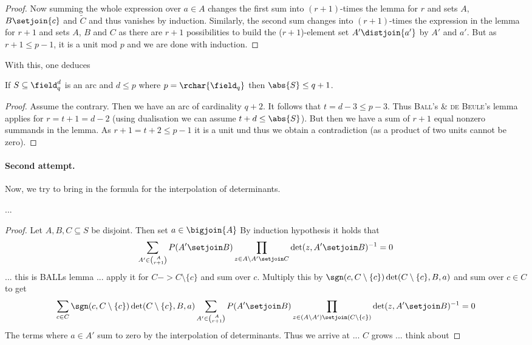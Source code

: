 \message{ !name(OnTheRAIDProblem.tex)}\documentclass[8pt,a4paper]{article}
\begin{document}
\begin{proof}
Now summing the whole expression over $a\in A$ changes the first sum into $(r+1)$-times the lemma for $r$ and sets $A$, $B\setjoin\{c\}$ and $\tilde{C}$ and thus vanishes by induction. Similarly, the second sum changes into $(r+1)$-times the expression in the lemma for $r+1$ and sets $A$, $B$ and $C$ as there are $r+1$ possibilities to build the ($r+1$)-element set $A'\distjoin\{a'\}$ by $A'$ and $a'$. But as $r+1\leq p-1$, it is a unit mod $p$ and we are done with induction.
\end{proof}

With this, one deduces

\begin{corollary}\label{cor:mdsconjpcase}
If $S\subseteq \field_q^d$ is an arc and $d\leq p$ where $p=\rchar{\field_q}$ then $\abs{S}\leq q+1$.
\end{corollary}

\begin{proof}
Assume the contrary. Then we have an arc of cardinality $q+2$. It follows that $t=d-3\leq p-3$. Thus \textsc{Ball}'s \& \textsc{de Beule}'s lemma applies for $r=t+1=d-2$ (using dualisation we can assume $t+d\leq \abs{S}$). But then we have a sum of $r+1$ equal nonzero summands in the lemma.
As $r+1=t+2\leq p-1$ it is a unit und thus we obtain a contradiction
(as a product of two units cannot be zero).
\end{proof}

\paragraph{Second attempt.} Now, we try to bring in the formula for
the interpolation of determinants.

\begin{lemma}
...
\end{lemma}

\begin{proof}
Let $A,B,C\subseteq S$ be disjoint. Then set $a\in \bigjoin{A}$
By induction hypothesis it holds that
\begin{align}
\sum_{A'\in\binom{A}{r+1}}{P(A'\setjoin B)\prod_{z\in A\setminus A'\setjoin C}\det(z,A'\setjoin B)^{-1}}=0
\end{align}
... this is BALLs lemma ... apply it for $C-> C\setminus\{c\}$ and sum
over $c$.
Multiply this by $\sgn(c,C\setminus\{c\})\det(C\setminus\{c\},B,a)$
and sum over $c\in C$ to get
\begin{align}
\sum_{c\in
  C}\sgn(c,C\setminus\{c\})\det(C\setminus\{c\},B,a)\sum_{A'\in\binom{A}{r+1}}{P(A'\setjoin
  B)\prod_{z\in(A\setminus A')\setjoin(C\setminus\{c\})}\det(z,A'\setjoin
  B)^{-1}}=0
\end{align}
The terms where $a\in A'$ sum to zero by the interpolation of
determinants. Thus we arrive at ... $C$ grows ... think about
\end{proof}
\end{document}
